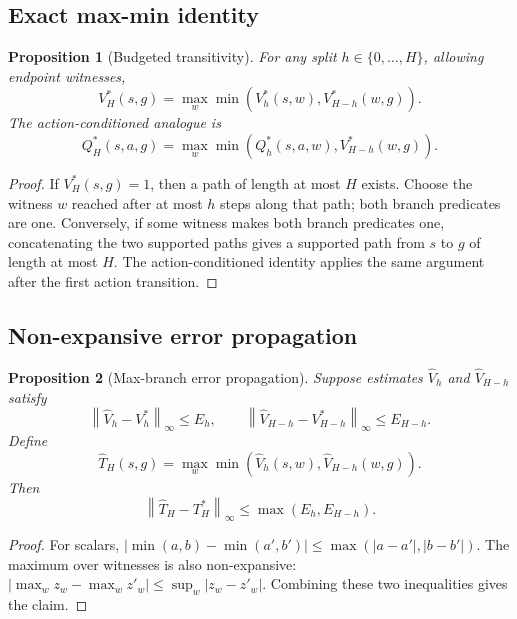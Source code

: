 \documentclass[11pt]{article}
\newtheorem{proposition}{Proposition}
\newcommand{\norm}[1]{\left\lVert #1 \right\rVert}
\begin{document}
\subsection{Exact max-min identity}

\begin{proposition}[Budgeted transitivity]
For any split $h\in\{0,\ldots,H\}$, allowing endpoint witnesses,
\begin{equation}
    V_H^*(s,g)=\max_w \min\left(V_h^*(s,w),V_{H-h}^*(w,g)\right).
\end{equation}
The action-conditioned analogue is
\begin{equation}
    Q_H^*(s,a,g)=\max_w \min\left(Q_h^*(s,a,w),V_{H-h}^*(w,g)\right).
\end{equation}
\end{proposition}

\begin{proof}
If $V_H^*(s,g)=1$, then a path of length at most $H$ exists. Choose the witness
$w$ reached after at most $h$ steps along that path; both branch predicates are
one. Conversely, if some witness makes both branch predicates one, concatenating
the two supported paths gives a supported path from $s$ to $g$ of length at most
$H$. The action-conditioned identity applies the same argument after the first
action transition.
\end{proof}

\subsection{Non-expansive error propagation}

\begin{proposition}[Max-branch error propagation]
Suppose estimates $\widehat V_h$ and $\widehat V_{H-h}$ satisfy
\begin{equation}
    \norm{\widehat V_h - V_h^*}_\infty \le E_h,
    \qquad
    \norm{\widehat V_{H-h} - V_{H-h}^*}_\infty \le E_{H-h}.
\end{equation}
Define
\begin{equation}
    \widehat T_H(s,g)=\max_w \min\left(\widehat V_h(s,w),\widehat V_{H-h}(w,g)\right).
\end{equation}
Then
\begin{equation}
    \norm{\widehat T_H-T_H^*}_\infty\le \max(E_h,E_{H-h}).
\end{equation}
\end{proposition}

\begin{proof}
For scalars, $|\min(a,b)-\min(a',b')|\le
\max(|a-a'|,|b-b'|)$. The maximum over witnesses is also non-expansive:
$|\max_w z_w-\max_w z'_w|\le \sup_w |z_w-z'_w|$. Combining these two inequalities
gives the claim.
\end{proof}
\end{document}

